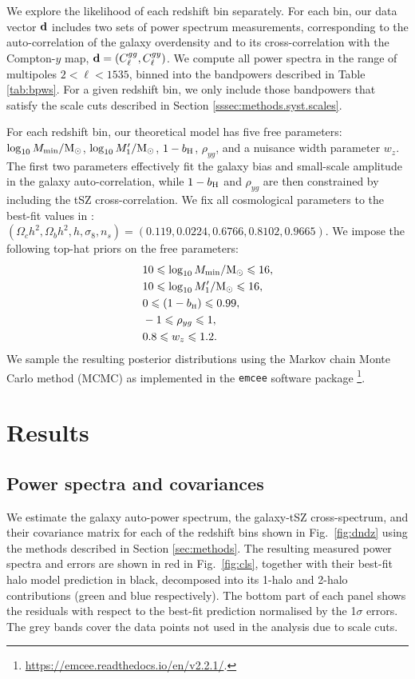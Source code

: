 \documentclass[useAMS,usenatbib]{mn2e}
\def\bH{b_{\scriptscriptstyle\rm H}}
\begin{document}
    We explore the likelihood of each redshift bin separately. For each bin, our data vector ${\bf d}$ includes two sets of power spectrum measurements, corresponding to the auto-correlation of the galaxy overdensity and to its cross-correlation with the Compton-$y$ map, ${\bf d}=(C^{gg}_\ell,C^{gy}_\ell)$. We compute all power spectra in the range of multipoles $2<\ell<1535$, binned into the bandpowers described in Table \ref{tab:bpws}. For a given redshift bin, we only include those bandpowers that satisfy the scale cuts described in Section \ref{sssec:methods.syst.scales}.

    For each redshift bin, our theoretical model has five free parameters: $\log_{10}M_{\rm min}/{\rm M_\odot}$, $\log_{10}M_1'/{\rm M_\odot}$, $1-b_{\rm H}$, $\rho_{yg}$, and a nuisance width parameter $w_z$. The first two parameters effectively fit the galaxy bias and small-scale amplitude in the galaxy auto-correlation, while $1-b_{\rm H}$ and $\rho_{yg}$ are then constrained by including the tSZ cross-correlation. We fix all cosmological parameters to the best-fit values in \cite{2018arXiv180706209P}: $(\Omega_c h^2,\Omega_bh^2,h,\sigma_8,n_s)=(0.119,0.0224,0.6766,0.8102,0.9665)$. We impose the following top-hat priors on the free parameters:
    \begin{align}
      &10\le\log_{10}M_{\rm min}/{\rm M_\odot}\le16,\\
      &10\le\log_{10}M_1'/{\rm M_\odot}\le16,\\
      &0\le(1-\bH)\le0.99,\\
      &-1\le\rho_{yg}\le1,\\
      &0.8\le w_z\le1.2.
    \end{align}
    We sample the resulting posterior distributions using the Markov chain Monte Carlo method (MCMC) as implemented in the {\tt emcee} software package \citep{2013PASP..125..306F}\footnote{\url{https://emcee.readthedocs.io/en/v2.2.1/}.}.

\section{Results}\label{sec:results}
  \subsection{Power spectra and covariances}\label{ssec:results.cls}
    We estimate the galaxy auto-power spectrum, the galaxy-tSZ cross-spectrum, and their covariance matrix for each of the redshift bins shown in Fig.\!~\ref{fig:dndz} using the methods described in Section \ref{sec:methods}. The resulting measured power spectra and errors are shown in red in Fig.\!~\ref{fig:cls}, together with their best-fit halo model prediction in black, decomposed into its 1-halo and 2-halo contributions (green and blue respectively). The bottom part of each panel shows the residuals with respect to the best-fit prediction normalised by the 1$\sigma$ errors. The grey bands cover the data points not used in the analysis due to scale cuts.
    
\end{document}
